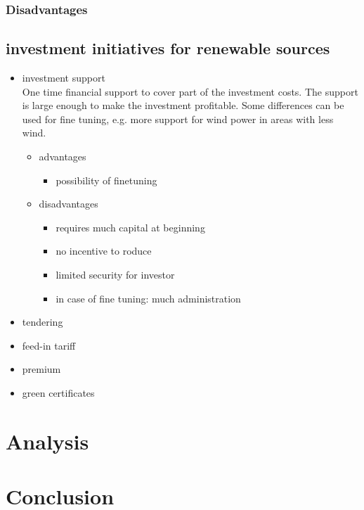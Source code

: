 \documentclass{article}
\begin{document}
\subsubsection{Disadvantages}
\subsection{investment initiatives for renewable sources}
\begin{itemize}
\item investment support\\
One time financial support to cover part of the investment costs.  The support is large enough to make the investment profitable. Some differences can be used for fine tuning, e.g. more support for wind power in areas with less wind.
\begin{itemize}
\item advantages
\begin{itemize}
\item possibility of finetuning
\end{itemize}
\item disadvantages
\begin{itemize}
\item requires much capital at beginning
\item no incentive to roduce
\item limited security for investor
\item in case of fine tuning: much administration
\end{itemize}
\end{itemize}
\item tendering
\item feed-in tariff
\item premium
\item green certificates
\end{itemize}

\section{Analysis}

\newpage
\section{Conclusion}
\end{document}
